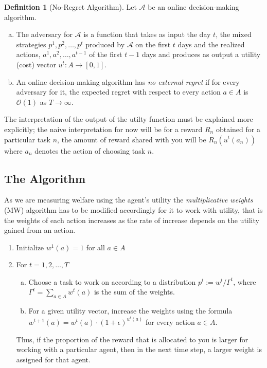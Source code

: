 \documentclass[a4paper,10pt]{article}
\theoremstyle{definition}
\newtheorem{defn}[thm]{Definition}
\begin{document}
\begin{defn}[No-Regret Algorithm]
Let $\mathcal{A}$ be an online decision-making algorithm.
\begin{enumerate}[(a)]
\item The adversary for $\mathcal{A}$ is a function that takes as input the day $t$, the mixed strategies $p^1,p^2,\ldots,p^t$ produced by $\mathcal{A}$ on the first $t$ days and the realized actions, $a^1,a^2,\ldots, a^{t-1}$ of the first $t-1$ days and produces as output a utility (cost) vector $u^t:A\to [0,1]$.
\item An online decision-making algorithm has \emph{no external regret} if for every adversary for it, the expected regret with respect to every action $a\in A$ is $\mathcal{O}(1)$ as $T \to \infty$.
\end{enumerate}
\end{defn}
The interpretation of the output of the utilty function must be explained more explicitly; the naive interpretation for now will be for a reward $R_n$ obtained for a particular task $n$, the amount of reward shared with you will be $R_n(u^t(a_n))$ where $a_n$ denotes the action of choosing task $n$.


\subsection*{The Algorithm}
As we are measuring welfare using the agent's utility the \emph{multiplicative weights} (MW) algorithm has to be modified accordingly for it to work with utility, that is the weights of each action increases as the rate of increase depends on the utility gained from an action.
\begin{enumerate}[1.]
\item Initialize $w^1(a)=1$ for all $a \in A$
\item For $t=1,2,\ldots,T$
\begin{enumerate}[(a)]
\item Choose a task to work on according to a distribution $p^t:=w^t/\Gamma^t$, where $\Gamma^t=\sum_{a\in A}w^t(a)$ is the sum of the weights.
\item For a given utility vector, increase the weights using the formula $w^{t+1}(a)=w^t(a)\cdot (1+\epsilon)^{u^t(a)}$ for every action $a \in A$.
\end{enumerate}
Thus, if the proportion of the reward that is allocated to you is larger for working with a particular agent, then in the next time step, a larger weight is assigned for that agent.
\end{enumerate}
\end{document}
